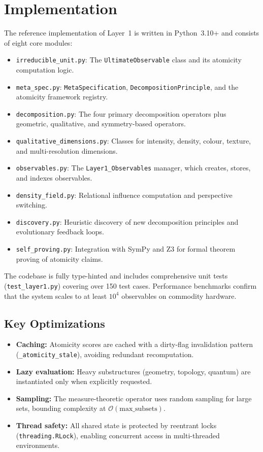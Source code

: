 \clearpage
\section{Implementation}
\label{sec:implementation}

The reference implementation of Layer~1 is written in Python~3.10+ and consists of eight core modules:

\begin{itemize}
    \item \texttt{irreducible\_unit.py}: The \texttt{UltimateObservable} class and its atomicity computation logic.
    \item \texttt{meta\_spec.py}: \texttt{MetaSpecification}, \texttt{DecompositionPrinciple}, and the atomicity framework registry.
    \item \texttt{decomposition.py}: The four primary decomposition operators plus geometric, qualitative, and symmetry-based operators.
    \item \texttt{qualitative\_dimensions.py}: Classes for intensity, density, colour, texture, and multi-resolution dimensions.
    \item \texttt{observables.py}: The \texttt{Layer1\_Observables} manager, which creates, stores, and indexes observables.
    \item \texttt{density\_field.py}: Relational influence computation and perspective switching.
    \item \texttt{discovery.py}: Heuristic discovery of new decomposition principles and evolutionary feedback loops.
    \item \texttt{self\_proving.py}: Integration with SymPy and Z3 for formal theorem proving of atomicity claims.
\end{itemize}

The codebase is fully type-hinted and includes comprehensive unit tests (\texttt{test\_layer1.py}) covering over 150 test cases. Performance benchmarks confirm that the system scales to at least $10^4$ observables on commodity hardware.

\subsection{Key Optimizations}

\begin{itemize}
    \item \textbf{Caching:} Atomicity scores are cached with a dirty-flag invalidation pattern (\texttt{\_atomicity\_stale}), avoiding redundant recomputation.
    \item \textbf{Lazy evaluation:} Heavy substructures (geometry, topology, quantum) are instantiated only when explicitly requested.
    \item \textbf{Sampling:} The measure-theoretic operator uses random sampling for large sets, bounding complexity at $\mathcal{O}(\text{max\_subsets})$.
    \item \textbf{Thread safety:} All shared state is protected by reentrant locks (\texttt{threading.RLock}), enabling concurrent access in multi-threaded environments.
\end{itemize}

